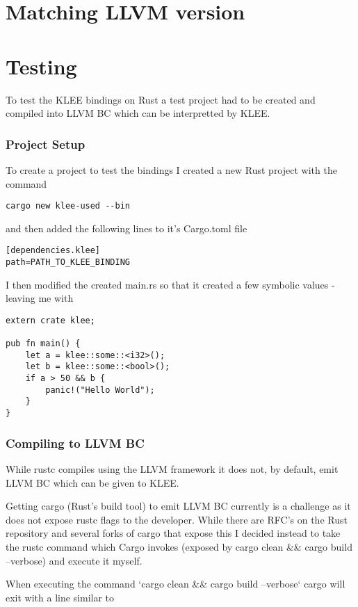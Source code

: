 \documentclass{report}
\begin{document}
\chapter {Matching LLVM version}
\chapter {Testing}

To test the KLEE bindings on Rust a test project had to be created and compiled into LLVM BC which can be interpretted by KLEE.

\subsection {Project Setup}
To create a project to test the bindings I created a new Rust project with the command
\begin{lstlisting}
cargo new klee-used --bin
\end{lstlisting}

and then added the following lines to it's Cargo.toml file
\begin{lstlisting}
[dependencies.klee]
path=PATH_TO_KLEE_BINDING
\end{lstlisting}

I then modified the created main.rs so that it created a few symbolic values - leaving me with
\begin{lstlisting}
extern crate klee;

pub fn main() {
    let a = klee::some::<i32>();
    let b = klee::some::<bool>();
    if a > 50 && b {
    	panic!("Hello World");
    }
}
\end{lstlisting}

\subsection {Compiling to LLVM BC}

While rustc compiles using the LLVM framework it does not, by default, emit LLVM BC which can be given to KLEE.

Getting cargo (Rust's build tool) to emit LLVM BC currently is a challenge as it does not expose rustc flags to the developer. While there are RFC's on the Rust repository and several forks of cargo that expose this I decided instead to take the rustc command which Cargo invokes (exposed by cargo clean && cargo build --verbose) and execute it myself.

When executing the command `cargo clean && cargo build --verbose` cargo will exit with a line similar to
\end{document}
